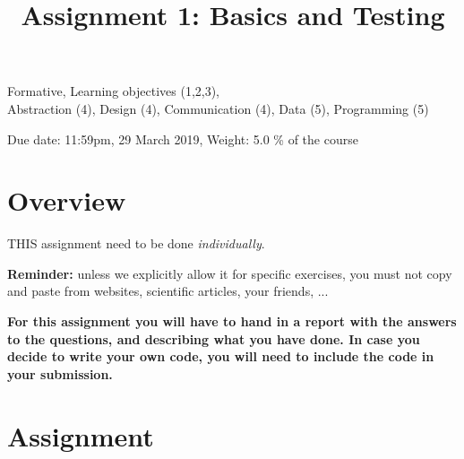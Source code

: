 \documentclass{pracs}
\newcommand{\duedate}{29 March 2019}
\begin{document}
\title{Assignment 1: Basics and Testing}
\maketitle
\thispagestyle{fancy}


	Formative, 	Learning objectives (1,2,3),\\
 	Abstraction (4), 	Design (4), 	Communication (4), 	Data (5),	Programming (5)




\noindent 

 \begin{center}
    Due date: 11:59pm, \duedate, Weight: 5.0 \% of the course
  \end{center}




\section{Overview}
THIS assignment need to be done \emph{individually}. 

\textbf{Reminder:} unless we explicitly allow it for specific exercises, you must not copy and paste from websites, scientific articles, your friends, ...

\textbf{For this assignment you will have to hand in a report with the answers to the questions, and describing what you have done. In case you decide to write your own code,  you will need to include the code in your submission.}



\section{Assignment}
\end{document}
